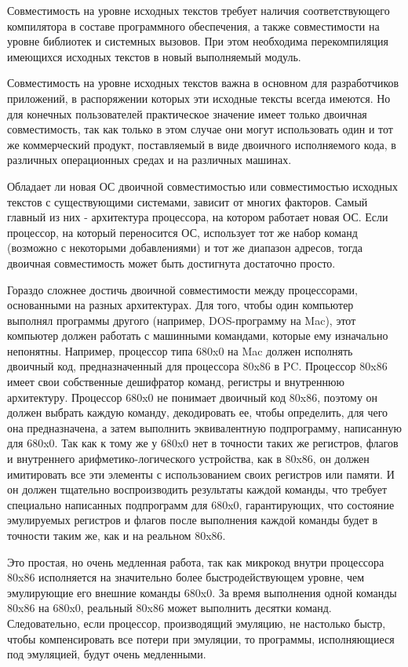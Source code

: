 Совместимость на уровне исходных текстов требует наличия соответствующего компилятора в составе программного обеспечения, а также совместимости на уровне библиотек и системных вызовов. При этом необходима перекомпиляция имеющихся исходных текстов в новый выполняемый модуль.

Совместимость на уровне исходных текстов важна в основном для разработчиков приложений, в распоряжении которых эти исходные тексты всегда имеются. Но для
конечных пользователей практическое значение имеет только двоичная совместимость, так как только в этом случае они могут использовать один и тот же коммерческий продукт, поставляемый в виде двоичного исполняемого кода, в различных операционных средах и на различных машинах.

Обладает ли новая ОС двоичной совместимостью или совместимостью исходных текстов с существующими системами, зависит от многих факторов. Самый главный из них - архитектура процессора, на котором работает новая ОС. Если процессор, на который переносится ОС, использует тот же набор команд (возможно с некоторыми добавлениями) и тот же диапазон адресов, тогда двоичная совместимость может быть достигнута достаточно просто.

Гораздо сложнее достичь двоичной совместимости между процессорами, основанными на разных архитектурах. Для того, чтобы один компьютер выполнял программы другого (например, DOS-программу на Mac), этот компьютер должен работать с машинными командами, которые ему изначально непонятны. Например, процессор типа 680x0 на Mac должен исполнять двоичный код, предназначенный для процессора 80x86 в PC. Процессор 80x86 имеет свои собственные дешифратор команд, регистры и внутреннюю архитектуру. Процессор 680x0 не понимает двоичный код 80x86, поэтому он должен выбрать каждую команду, декодировать ее, чтобы определить, для чего она предназначена, а затем выполнить эквивалентную подпрограмму, написанную для 680x0. Так как к тому же у 680x0 нет в точности таких же регистров, флагов и внутреннего арифметико-логического устройства, как в 80x86, он должен имитировать все эти элементы с использованием своих регистров или памяти. И он должен тщательно воспроизводить результаты каждой команды, что требует специально написанных подпрограмм для 680x0, гарантирующих, что состояние эмулируемых регистров и флагов после выполнения каждой команды будет в точности таким же, как и на реальном 80x86.

Это простая, но очень медленная работа, так как микрокод внутри процессора 80x86 исполняется на значительно более быстродействующем уровне, чем эмулирующие его внешние команды 680x0. За время выполнения одной команды 80x86 на 680x0, реальный 80x86 может выполнить десятки команд. Следовательно, если процессор, производящий эмуляцию, не настолько быстр, чтобы компенсировать все потери при эмуляции, то программы, исполняющиеся под эмуляцией, будут очень медленными.

